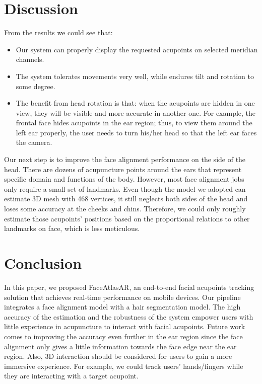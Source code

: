\section{Discussion}
\label{sec:discussion}
From the results we could see that:
\begin{itemize}
  \item Our system can properly display the requested acupoints on selected meridian channels.
  \item The system tolerates movements very well, while endures tilt and rotation to some degree.
  \item The benefit from head rotation is that: when the acupoints are hidden in one view, they will be visible and more accurate in another one. For example, the frontal face hides acupoints in the ear region; thus, to view them around the left ear properly, the user needs to turn his/her head so that the left ear faces the camera.
\end{itemize}
Our next step is to improve the face alignment performance on the side of the head. There are dozens of acupuncture points around the ears that represent specific domain and functions of the body. However, most face alignment jobs only require a small set of landmarks. Even though the model we adopted can estimate 3D mesh with 468 vertices, it still neglects both sides of the head and loses some accuracy at the cheeks and chins. Therefore, we could only roughly estimate those acupoints’ positions based on the proportional relations to other landmarks on face, which is less meticulous.

\section{Conclusion}
\label{sec:conclusion}
In this paper, we proposed FaceAtlasAR, an end-to-end facial acupoints tracking solution that achieves real-time performance on mobile devices. Our pipeline integrates a face alignment model with a hair segmentation model. The high accuracy of the estimation and the robustness of the system empower users with little experience in acupuncture to interact with facial acupoints. Future work comes to improving the accuracy even further in the ear region since the face alignment only gives a little information towards the face edge near the ear region. Also, 3D interaction should be considered for users to gain a more immersive experience. For example, we could track users’ hands/fingers while they are interacting with a target acupoint.

